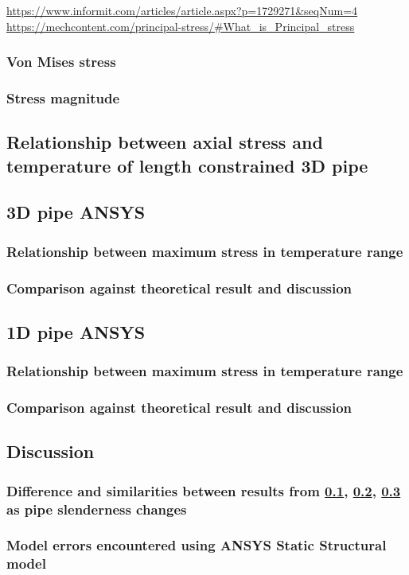 \url{https://www.informit.com/articles/article.aspx?p=1729271&seqNum=4}
\url{https://mechcontent.com/principal-stress/#What_is_Principal_stress}
\subsubsection{Von Mises stress}
\subsubsection{Stress magnitude}
\subsection{Relationship between axial stress and temperature of length constrained 3D pipe}\label{part1b}
\subsection{3D pipe ANSYS}\label{part1c}
\subsubsection{Relationship between maximum stress in temperature range}
\subsubsection{Comparison against theoretical result and discussion}
\subsection{1D pipe ANSYS}\label{part1d}
\subsubsection{Relationship between maximum stress in temperature range}
\subsubsection{Comparison against theoretical result and discussion}
\subsection{Discussion}
\subsubsection{Difference and similarities between results from \ref{part1b}, \ref{part1c}, \ref{part1d} as pipe slenderness changes}
\subsubsection{Model errors encountered using ANSYS Static Structural model}